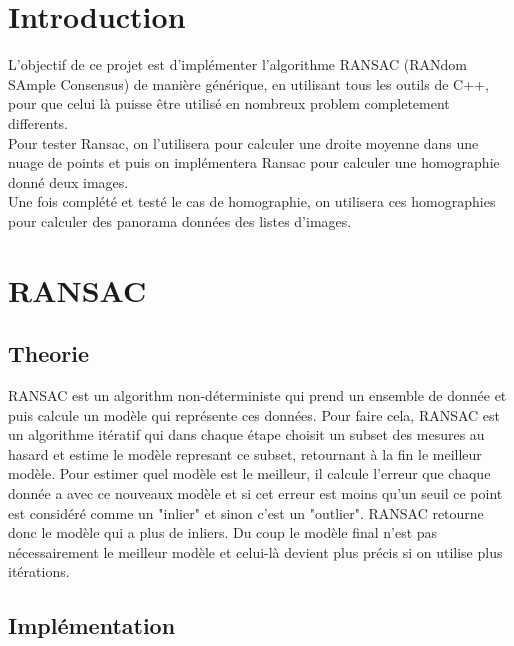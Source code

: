 \documentclass[11pt]{article}
\begin{document}
\section{Introduction}

L’objectif de ce projet est d'implémenter l'algorithme RANSAC (RANdom SAmple Consensus) de manière générique, en utilisant tous les outils de C++, pour que celui là puisse être utilisé en nombreux problem completement differents. \\
Pour tester Ransac, on l’utilisera pour calculer une droite moyenne dans une nuage de points et puis on implémentera Ransac pour calculer une homographie donné deux images. \\
Une fois complété et testé le cas de homographie, on utilisera ces homographies pour calculer des panorama données des listes d’images.

\section{RANSAC}

\subsection{Theorie}

RANSAC est un algorithm non-déterministe qui prend un ensemble de donnée et puis calcule un modèle qui représente ces données. Pour faire cela, RANSAC est un algorithme itératif qui dans chaque étape choisit un subset des mesures au hasard et estime le modèle represant ce subset, retournant à la fin le meilleur modèle. Pour estimer quel modèle est le meilleur, il calcule l’erreur que chaque donnée a avec ce nouveaux modèle et si cet erreur est moins qu’un seuil ce point est considéré comme un "inlier" et sinon c’est un "outlier". RANSAC retourne donc le modèle qui a plus de inliers.  Du coup le modèle final n’est pas nécessairement le meilleur modèle et celui-là devient plus précis si on utilise plus itérations. 

\subsection{Implémentation}
\end{document}

